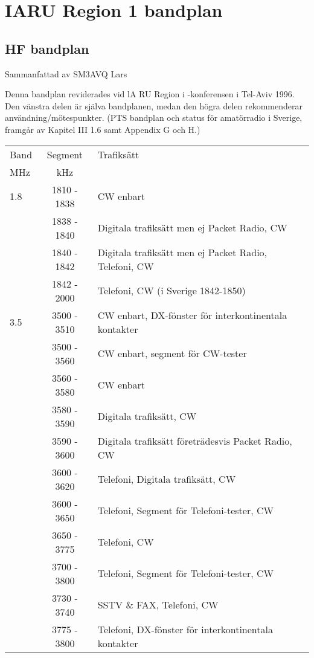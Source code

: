 \chapter{IARU Region 1 bandplan}

\section{HF bandplan}

Sammanfattad av SM3AVQ Lars

Denna bandplan reviderades vid lA RU Region i -konferensen i Tel-Aviv 1996.
Den vänstra delen är själva bandplanen, medan den högra delen rekommenderar användning/mötespunkter.
(PTS bandplan och status för amatörradio i Sverige, framgår av Kapitel III 1.6 samt Appendix G och H.)

\setlongtables
\begin{longtable}{lcl}
Band & Segment & Trafiksätt \\
MHz  & kHz     & \\ \hline
\endhead

1.8  & 1810 - 1838 & CW enbart \\
     & 1838 - 1840 & Digitala trafiksätt men ej Packet Radio, CW \\
     & 1840 - 1842 & Digitala trafiksätt men ej Packet Radio, Telefoni, CW \\
     & 1842 - 2000 & Telefoni, CW (i Sverige 1842-1850) \\

3.5  & 3500 - 3510 & CW enbart, DX-fönster för interkontinentala kontakter \\
     & 3500 - 3560 & CW enbart, segment för CW-tester \\
     & 3560 - 3580 & CW enbart \\
     & 3580 - 3590 & Digitala trafiksätt, CW \\
     & 3590 - 3600 & Digitala trafiksätt företrädesvis Packet Radio, CW \\
     & 3600 - 3620 & Telefoni, Digitala trafiksätt, CW \\
     & 3600 - 3650 & Telefoni, Segment för Telefoni-tester, CW \\
     & 3650 - 3775 & Telefoni, CW \\
     & 3700 - 3800 & Telefoni, Segment för Telefoni-tester, CW \\
     & 3730 - 3740 & SSTV \& FAX, Telefoni, CW \\
     & 3775 - 3800 & Telefoni, DX-fönster för interkontinentala kontakter \\


\end{longtable}
